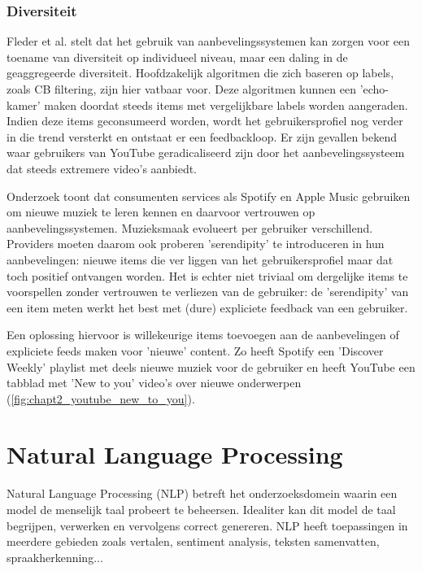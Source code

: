 
\subsubsection{Diversiteit}
Fleder et al. \cite{recsys_diversity} stelt dat het gebruik van aanbevelingssystemen kan zorgen voor een toename van diversiteit op individueel niveau, maar een daling in de geaggregeerde diversiteit. Hoofdzakelijk algoritmen die zich baseren op labels, zoals CB filtering, zijn hier vatbaar voor. Deze algoritmen kunnen een 'echo-kamer' maken doordat steeds items met vergelijkbare labels worden aangeraden. Indien deze items geconsumeerd worden, wordt het gebruikersprofiel nog verder in die trend versterkt en ontstaat er een feedbackloop. Er zijn gevallen bekend waar gebruikers van YouTube geradicaliseerd zijn door het aanbevelingssysteem dat steeds extremere video's aanbiedt.

\cite{youtube_radicalisation} Onderzoek toont dat consumenten services als Spotify en Apple Music gebruiken om nieuwe muziek te leren kennen en daarvoor vertrouwen op aanbevelingssystemen. \cite{recsys_serendipity_music} Muzieksmaak evolueert per gebruiker verschillend. Providers moeten daarom ook proberen 'serendipity' te introduceren in hun aanbevelingen: nieuwe items die ver liggen van het gebruikersprofiel maar dat toch positief ontvangen worden. Het is echter niet triviaal om dergelijke items te voorspellen zonder vertrouwen te verliezen van de gebruiker: de 'serendipity' van een item meten werkt het best met (dure) expliciete feedback van een gebruiker.

Een oplossing hiervoor is willekeurige items toevoegen aan de aanbevelingen of expliciete feeds maken voor 'nieuwe' content. \cite{youtube_randomness, youtube_new_to_you} Zo heeft Spotify een 'Discover Weekly' playlist met deels nieuwe muziek voor de gebruiker en heeft YouTube een tabblad met 'New to you' video's over nieuwe onderwerpen (\autoref{fig:chapt2_youtube_new_to_you}).


\section{Natural Language Processing}
Natural Language Processing (NLP) \cite{what_is_nlp} betreft het onderzoeksdomein waarin een model de menselijk taal probeert te beheersen. Idealiter kan dit model de taal begrijpen, verwerken en vervolgens correct genereren. NLP heeft toepassingen in meerdere gebieden \cite{nlp_use_cases} zoals vertalen, sentiment analysis, teksten samenvatten, spraakherkenning...

